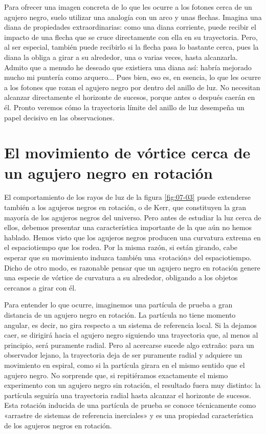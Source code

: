 Para ofrecer una imagen concreta de lo que les ocurre a los fotones cerca de un agujero negro, suelo utilizar una analogía con un arco y unas flechas. Imagina una diana de propiedades extraordinarias: como una diana corriente, puede recibir el impacto de una flecha que se cruce directamente con ella en su trayectoria. Pero, al ser especial, también puede recibirlo si la flecha pasa lo bastante cerca, pues la diana la obliga a girar a su alrededor, una o varias veces, hasta alcanzarla. Admito que a menudo he deseado que existiera una diana así: habría mejorado mucho mi puntería como arquero... Pues bien, eso es, en esencia, lo que les ocurre a los fotones que rozan el agujero negro por dentro del anillo de luz. No necesitan alcanzar directamente el horizonte de sucesos, porque antes o después caerán en él. Pronto veremos cómo la trayectoria límite del anillo de luz desempeña un papel decisivo en las observaciones.

\section[El movimiento de vórtice]{El movimiento de vórtice cerca de un agujero negro en rotación}\label{sec:07-rotation}

El comportamiento de los rayos de luz de la figura \ref{fig:07-03} puede extenderse también a los agujeros negros en rotación, o de Kerr, que constituyen la gran mayoría de los agujeros negros del universo. Pero antes de estudiar la luz cerca de ellos, debemos presentar una característica importante de la que aún no hemos hablado. Hemos visto que los agujeros negros producen una curvatura extrema en el espaciotiempo que los rodea. Por la misma razón, si están girando, cabe esperar que su movimiento induzca también una «rotación» del espaciotiempo. Dicho de otro modo, es razonable pensar que un agujero negro en rotación genere una especie de vórtice de curvatura a su alrededor, obligando a los objetos cercanos a girar con él.

Para entender lo que ocurre, imaginemos una partícula de prueba a gran distancia de un agujero negro en rotación. La partícula no tiene momento angular, es decir, no gira respecto a un sistema de referencia local. Si la dejamos caer, se dirigirá hacia el agujero negro siguiendo una trayectoria que, al menos al principio, será puramente radial. Pero al acercarse sucede algo extraño: para un observador lejano, la trayectoria deja de ser puramente radial y adquiere un movimiento en espiral, como si la partícula girara en el mismo sentido que el agujero negro. No sorprende que, si repitiéramos exactamente el mismo experimento con un agujero negro sin rotación, el resultado fuera muy distinto: la partícula seguiría una trayectoria radial hasta alcanzar el horizonte de sucesos. Esta rotación inducida de una partícula de prueba se conoce técnicamente como «arrastre de sistemas de referencia inerciales» y es una propiedad característica de los agujeros negros en rotación.

